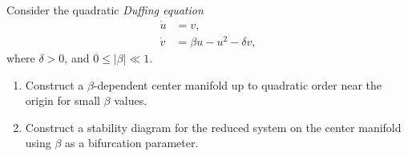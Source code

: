 \begin{enumerate}
\begin{ex}
\end{ex}

\begin{exercise}
Consider the quadratic \textit{Duffing equation}
\begin{align}
	\dot{u} &= v, \\
	\dot{v} &= \beta u - u^2 - \delta v,
\end{align}
where $\delta > 0$, and $0 \leq |\beta| \ll 1$.
\begin{enumerate}
	\item Construct a $\beta$-dependent center manifold up to quadratic order near the origin for small $\beta$ values.
	\item Construct a stability diagram for the reduced system on the center manifold using $\beta$ as a bifurcation parameter.
\end{enumerate}
	
\end{exercise}



\end{enumerate}

